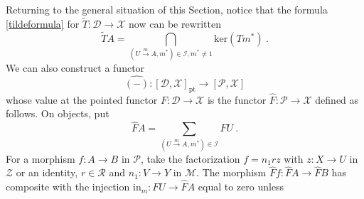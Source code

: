 \documentclass[a4paper,12pt,reqno]{amsart}
\theoremstyle{definition}
\theoremstyle{fact}
\theoremstyle{genquest}
\theoremstyle{step}
\newcommand{\lra}{\longrightarrow}
\newcommand{\ra}{\rightarrow}
\def\CD{{\mathscr D}}
\def\CI{{\mathscr I}}
\def\CM{{\mathscr M}}
\def\CP{{\mathscr P}}
\def\CR{{\mathscr R}}
\def\CX{{\mathscr X}}
\def\CZ{{\mathscr Z}}
\begin{document}
\bigskip
Returning to the general situation of this Section, notice that the formula \eqref{tildeformula}
for $\widetilde{T}: \CD\lra \CX$ now can be rewritten
\begin{equation}\label{tildeformula2}
\widetilde{T}A = \bigcap_{(U\stackrel{m}\lra A,m^*) \in \CI, m^*\neq 1} {\mathrm{ker}}(Tm^*) \ .
\end{equation}
We can also construct a functor
\begin{equation}\label{hat}
\widehat{(-)} : [\CD,\CX]_{\mathrm{pt}} \lra [\CP,\CX]
\end{equation}
whose value at the pointed functor $F : \CD\lra \CX$
is the functor $\widehat{F} : \CP \lra \CX$ defined as follows.   
On objects, put
$$\widehat{F}A = \sum_{(U\stackrel{m}\lra A,m^*) \in \CI}{FU} \ .$$
For a morphism $f:A\lra B$ in $\CP$, take the factorization
$f = n_1rz$ with $z:X\ra U$ in $\CZ$ or an identity, $r\in \CR$ 
and $n_1:V\ra Y$ in $\CM$.  
The morphism $\widehat{F}f: \widehat{F}A \lra \widehat{F}B$
has composite with the injection $\mathrm{in}_m : FU \ra \widehat{F}A$
equal to zero unless 
\end{document}
